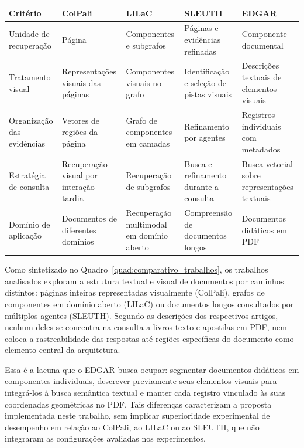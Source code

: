 \begin{quadro}[H]
\centering
\caption{Análise comparativa dos trabalhos relacionados e o presente trabalho.}
\label{quad:comparativo_trabalhos}
\begingroup
\footnotesize
\renewcommand{\arraystretch}{1.2}
\begin{tabularx}{\textwidth}{|p{2.5cm}|X|X|X|X|}
\hline
\textbf{Critério} & \textbf{ColPali} & \textbf{LILaC} & \textbf{SLEUTH} & \textbf{EDGAR} \\
\hline
Unidade de recuperação & Página & Componentes e subgrafos & Páginas e evidências refinadas & Componente documental \\
\hline
Tratamento visual & Representações visuais das páginas & Componentes visuais no grafo & Identificação e seleção de pistas visuais & Descrições textuais de elementos visuais \\
\hline
Organização das evidências & Vetores de regiões da página & Grafo de componentes em camadas & Refinamento por agentes & Registros individuais com metadados \\
\hline
Estratégia de consulta & Recuperação visual por interação tardia & Recuperação de subgrafos & Busca e refinamento durante a consulta & Busca vetorial sobre representações textuais \\
\hline
Domínio de aplicação & Documentos de diferentes domínios & Recuperação multimodal em domínio aberto & Compreensão de documentos longos & Documentos didáticos em PDF \\
\hline
\end{tabularx}
\endgroup
{}
\end{quadro}

Como sintetizado no Quadro~\ref{quad:comparativo_trabalhos}, os trabalhos analisados exploram a estrutura textual e visual de documentos por caminhos distintos: páginas inteiras representadas visualmente (ColPali), grafos de componentes em domínio aberto (LILaC) ou documentos longos consultados por múltiplos agentes (SLEUTH). Segundo as descrições dos respectivos artigos, nenhum deles se concentra na consulta a livros-texto e apostilas em PDF, nem coloca a rastreabilidade das respostas até regiões específicas do documento como elemento central da arquitetura.

Essa é a lacuna que o EDGAR busca ocupar: segmentar documentos didáticos em componentes individuais, descrever previamente seus elementos visuais para integrá-los à busca semântica textual e manter cada registro vinculado às suas coordenadas geométricas no PDF. Tais diferenças caracterizam a proposta implementada neste trabalho, sem implicar superioridade experimental de desempenho em relação ao ColPali, ao LILaC ou ao SLEUTH, que não integraram as configurações avaliadas nos experimentos.
